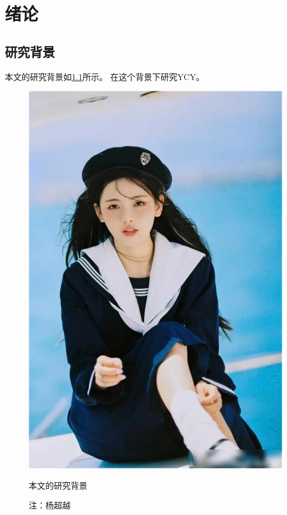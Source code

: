 \ifx\mainpage\undefined
\def\chpOne{chpOne}

\fi

\chapter{绪论}
\label{chp1}
%
\section{研究背景}
\label{chp1:research_background}
%
本文的研究背景如\cref{chp1:fig:intro}所示。
在这个背景下研究\gls{YCY}。

\begin{figure}[!ht]
\centering
\includegraphics[scale=0.4]{chp1_figures/chaoyue_intro.pdf}
\caption[本文的研究背景]{本文的研究背景}
\caption*{注：杨超越}
\label{chp1:fig:intro}
\end{figure}

